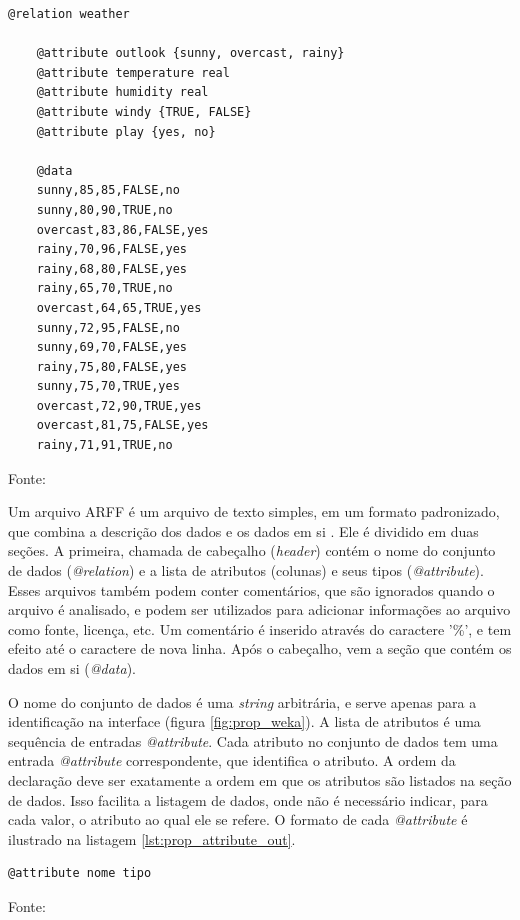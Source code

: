 \vspace{0.5cm}
\begin{lstlisting}[caption=Exemplo de arquivo no formato ARFF, label=lst:prop_arff]
    @relation weather

    @attribute outlook {sunny, overcast, rainy}
    @attribute temperature real
    @attribute humidity real
    @attribute windy {TRUE, FALSE}
    @attribute play {yes, no}

    @data
    sunny,85,85,FALSE,no
    sunny,80,90,TRUE,no
    overcast,83,86,FALSE,yes
    rainy,70,96,FALSE,yes
    rainy,68,80,FALSE,yes
    rainy,65,70,TRUE,no
    overcast,64,65,TRUE,yes
    sunny,72,95,FALSE,no
    sunny,69,70,FALSE,yes
    rainy,75,80,FALSE,yes
    sunny,75,70,TRUE,yes
    overcast,72,90,TRUE,yes
    overcast,81,75,FALSE,yes
    rainy,71,91,TRUE,no
\end{lstlisting}
\vspace{0.25cm}
\centerline{Fonte: \cite{Hall2009}}
\vspace{0.5cm}

Um arquivo ARFF é um arquivo de texto simples, em um formato padronizado, que combina a descrição dos dados e os dados em si \cite{Hall2009}. Ele é dividido em duas seções. A primeira, chamada de cabeçalho (\emph{header}) contém o nome do conjunto de dados (\emph{@relation}) e a lista de atributos (colunas) e seus tipos (\emph{@attribute}). Esses arquivos também podem conter comentários, que são ignorados quando o arquivo é analisado, e podem ser utilizados para adicionar informações ao arquivo como fonte, licença, etc. Um comentário é inserido através do caractere '\%', e tem efeito até o caractere de nova linha. Após o cabeçalho, vem a seção que contém os dados em si (\emph{@data}).

O nome do conjunto de dados é uma \emph{string} arbitrária, e serve apenas para a identificação na interface (figura \ref{fig:prop_weka}). A lista de atributos é uma sequência de entradas \emph{@attribute}. Cada atributo no conjunto de dados tem uma entrada \emph{@attribute} correspondente, que identifica o atributo. A ordem da declaração deve ser exatamente a ordem em que os atributos são listados na seção de dados. Isso facilita a listagem de dados, onde não é necessário indicar, para cada valor, o atributo ao qual ele se refere. O formato de cada \emph{@attribute} é ilustrado na listagem \ref{lst:prop_attribute_out}.

\vspace{0.5cm}
\begin{lstlisting}[caption=Formato de uma entrada \emph{@attribute}, label=lst:prop_attribute_out]
@attribute nome tipo
\end{lstlisting}
\vspace{0.25cm}
\centerline{Fonte: \cite{Hall2009}}
\vspace{0.5cm}

